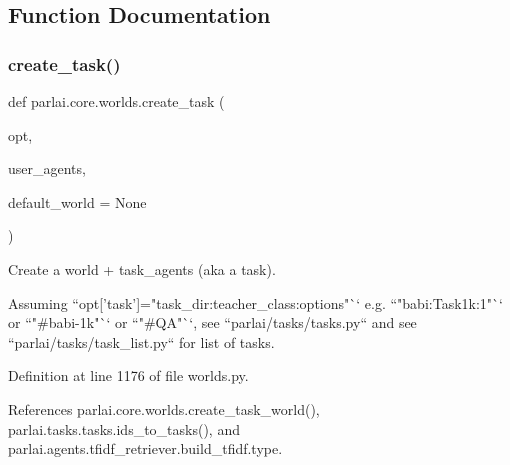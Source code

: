 \subsection{Function Documentation}
\mbox{\label{namespaceparlai_1_1core_1_1worlds_a11923c10b545c7ecc1b08fe2242d9c2c}} 
\subsubsection{\texorpdfstring{create\+\_\+task()}{create\_task()}}
{\footnotesize\ttfamily def parlai.\+core.\+worlds.\+create\+\_\+task (\begin{DoxyParamCaption}\item[{}]{opt,  }\item[{}]{user\+\_\+agents,  }\item[{}]{default\+\_\+world = {\ttfamily None} }\end{DoxyParamCaption})}

\begin{DoxyVerb}Create a world + task_agents (aka a task).

Assuming ``opt['task']="task_dir:teacher_class:options"``
e.g. ``"babi:Task1k:1"`` or ``"#babi-1k"`` or ``"#QA"``,
see ``parlai/tasks/tasks.py`` and see ``parlai/tasks/task_list.py``
for list of tasks.
\end{DoxyVerb}
 

Definition at line 1176 of file worlds.\+py.



References parlai.\+core.\+worlds.\+create\+\_\+task\+\_\+world(), parlai.\+tasks.\+tasks.\+ids\+\_\+to\+\_\+tasks(), and parlai.\+agents.\+tfidf\+\_\+retriever.\+build\+\_\+tfidf.\+type.



